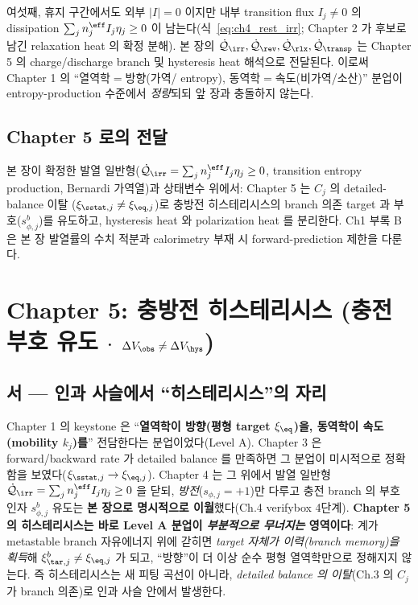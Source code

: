 여섯째, 휴지 구간에서도 외부 $|I|=0$ 이지만 내부 transition flux $I_j\ne0$ 의 dissipation $\sum_j n_j^{\eff}I_j\eta_j\ge0$
이 남는다(식~\eqref{eq:ch4_rest_irr}; Chapter 2 가 후보로 남긴 relaxation heat 의 확정 분해). 본 장의
$\dot{\mathcal Q}_{\irr},\dot{\mathcal Q}_{\rev},\dot{\mathcal Q}_{\rlx},\dot{\mathcal Q}_{\transp}$ 는 Chapter 5
의 charge/discharge branch 및 hysteresis heat 해석으로 전달된다. 이로써 Chapter 1 의 ``열역학$=$방향(가역/
entropy), 동역학$=$속도(비가역/소산)'' 분업이 entropy-production 수준에서 \emph{정량}되되 앞 장과 충돌하지 않는다.

\subsection*{Chapter 5 로의 전달}
본 장이 확정한 발열 일반형($\dot{\mathcal Q}_\irr=\sum_j n_j^{\eff}I_j\eta_j\ge0$, transition entropy
production, Bernardi 가역열)과 상태변수 위에서: Chapter 5 는 $C_j$ 의 detailed-balance 이탈
($\xi_{\sstat,j}\ne\xi_{\eq,j}$)로 충방전 히스테리시스의 branch 의존 target 과 부호($s_{\phi,j}^b$)를 유도하고,
hysteresis heat 와 polarization heat 를 분리한다. Ch1 부록 B 은 본 장 발열률의 수치 적분과 calorimetry 부재 시
forward-prediction 제한을 다룬다.



\clearpage
\section{Chapter 5: 충방전 히스테리시스 (충전 부호 유도 $\cdot$ $\Delta V_\obs\ne\Delta V_\hys$)}\label{chap:ch5}

\subsection*{서 — 인과 사슬에서 ``히스테리시스''의 자리}
Chapter 1 의 keystone 은 ``\textbf{열역학이 방향(평형 target $\xi_{\eq}$)을, 동역학이 속도(mobility $k_j$)를}''
전담한다는 분업이었다(Level A). Chapter 3 은 forward/backward rate 가 detailed balance 를 만족하면 그 분업이
미시적으로 정확함을 보였다($\xi_{\sstat,j}\to\xi_{\eq,j}$). Chapter 4 는 그 위에서 발열 일반형
$\dot{\mathcal Q}_\irr=\sum_j n_j^{\eff}I_j\eta_j\ge0$ 을 닫되, \emph{방전}($s_{\phi,j}=+1$)만 다루고 충전
branch 의 부호 인자 $s_{\phi,j}^b$ 유도는 \textbf{본 장으로 명시적으로 이월}했다(Ch.4 verifybox 4단계).
\textbf{Chapter 5 의 히스테리시스는 바로 Level A 분업이 \emph{부분적으로 무너지는} 영역이다}: 계가 metastable
branch 자유에너지 위에 갇히면 \emph{target 자체가 이력(branch memory)을 획득}해 $\xi_{\tar,j}^b\ne\xi_{\eq,j}$
가 되고, ``방향''이 더 이상 순수 평형 열역학만으로 정해지지 않는다. 즉 히스테리시스는 새 피팅 곡선이 아니라,
\emph{detailed balance 의 이탈}(Ch.3 의 $C_j$ 가 branch 의존)로 인과 사슬 안에서 발생한다.

